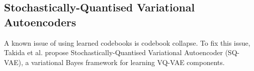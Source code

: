 






\subsection{Stochastically-Quantised Variational Autoencoders}
\label{sec:3.5.3}

A known issue of using learned codebooks is codebook collapse.
To fix this issue, Takida et al. \cite{SQVAE} propose Stochastically-Quantised Variational Autoencoder (SQ-VAE), a variational Bayes framework for learning VQ-VAE components.

